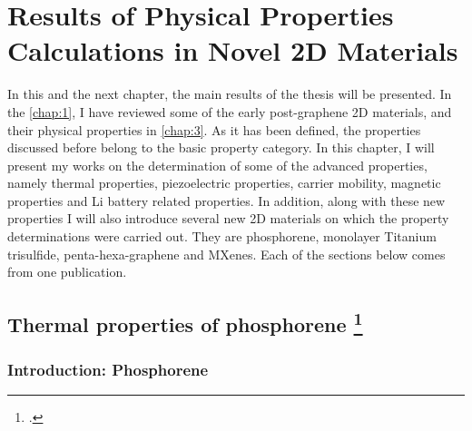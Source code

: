 
\chapter{Results of Physical Properties Calculations in Novel 2D Materials \label{chap:4}}

\ifpdf
    \graphicspath{{Chapter4/Figs/Raster/}{Chapter4/Figs/PDF/}{Chapter4/Figs/Vector/}}
\else
    \graphicspath{{Chapter4/Figs/Vector/}{Chapter4/Figs/}}
\fi


\nocite{Yimamu2012,Aierken2017.GNR}


In this and the next chapter, the main results of the thesis will be presented. In the \autoref{chap:1}, I have reviewed some of the early post-graphene 2D materials, and their physical properties in \autoref{chap:3}. As it has been defined, the properties discussed before belong to the basic property category. In this chapter, I will present my works on the determination of some of the advanced properties, namely thermal properties, piezoelectric properties, carrier mobility, magnetic properties and Li battery related properties. In addition, along with these new properties I will also introduce several new 2D materials on which the property determinations were carried out. They are phosphorene, monolayer Titanium trisulfide, penta-hexa-graphene and MXenes. Each of the sections below comes from one publication. 

\section[Thermal properties of phosphorene]{Thermal properties of phosphorene \footcite[This work is published in:][]{Aierken2015.thermalP} }


\subsection{Introduction: Phosphorene}

